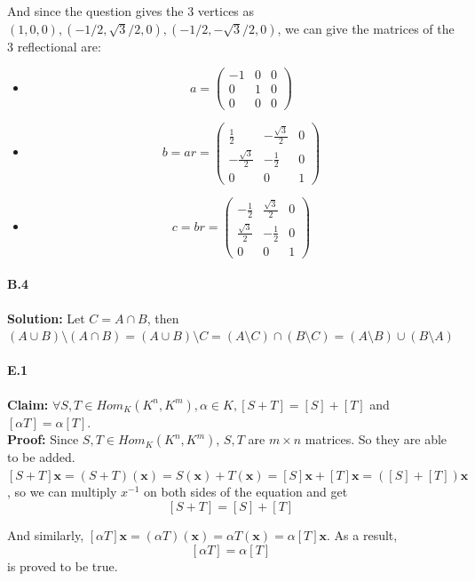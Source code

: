 \documentclass[11pt]{report}
\begin{document}
    And since the question gives the 3 vertices as $(1, 0, 0), (-1/2, \sqrt{3}/2, 0), (-1/2, -\sqrt{3}/2, 0)$, we can give the matrices of the 3 reflectional are:
    \begin{itemize}
        \item \[a = \left(\begin{array}{rrr} -1 & 0 & 0 \\ 0 & 1 & 0\\ 0 & 0 & 0 \end{array} \right)\]
        \item \[b = ar = \left(\begin{array}{rrr} \frac{1}{2} & -\frac{\sqrt{3}}{2} & 0 \\  -\frac{\sqrt{3}}{2} & -\frac{1}{2} & 0 \\ 0 & 0 & 1\end{array} \right)\]
        \item \[c = br = \left(\begin{array}{rrr} -\frac{1}{2} & \frac{\sqrt{3}}{2} & 0 \\  \frac{\sqrt{3}}{2} & -\frac{1}{2} & 0 \\ 0 & 0 & 1\end{array} \right)\]
    \end{itemize}

\paragraph{B.4} \textbf{Solution:} Let $C = A \cap B$, then $(A \cup B) \setminus (A \cap B) = (A \cup B) \setminus C = (A \setminus C) \cap (B \setminus C) = (A \setminus B) \cup (B \setminus A)$
\paragraph{E.1} \textbf{Claim:}  $\forall S, T \in Hom_K(K^n, K^m), \alpha \in K, [S + T] = [S] + [T]$ and $[\alpha T] = \alpha [T]$.\\

\textbf{Proof:} Since $S, T \in Hom_K(K^n, K^m)$, $S, T$ are $m \times n$ matrices. So they are able to be added. $[S + T]\textbf{x} = (S + T)(\textbf{x}) = S(\textbf{x}) + T(\textbf{x}) = [S]\textbf{x} + [T]{\textbf{x}} = ([S] + [T])\textbf{x}$, so we can multiply $x^{-1}$ on both sides of the equation and get \[[S + T] = [S] + [T]\]

And similarly, $[\alpha T]\textbf{x} = (\alpha T)(\textbf{x}) = \alpha T(\textbf{x}) = \alpha [T]\textbf{x}$. As a result,
    \[[\alpha T] = \alpha [T]\] 
is proved to be true.
\end{document}
